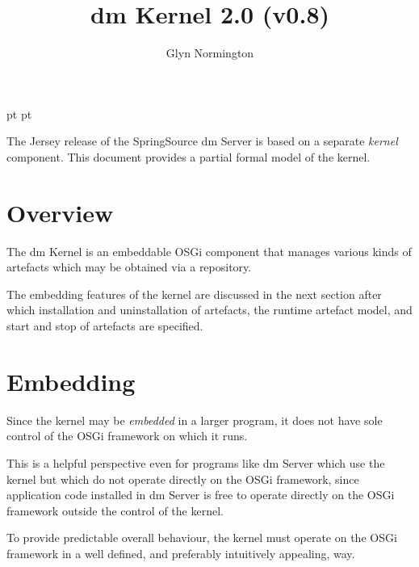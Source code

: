 \documentclass[a4paper,12pt]{article}
\begin{document}
 pt
 pt

\title{dm Kernel 2.0 (v0.8)}
\author{Glyn Normington}
\maketitle
\thispagestyle{myheadings}
\setcounter{page}{0}

The Jersey release of the SpringSource dm Server is based on a separate \textit{kernel} component.
This document provides a partial formal model of the kernel.
\clearpage
{}
\tableofcontents

\newcommand{\true}{true}
\newcommand{\false}{false}
\renewcommand{\empty}{\emptyset}

\clearpage
{}
\section{Overview}

The dm Kernel is an embeddable OSGi component that manages various kinds of artefacts which may be obtained via a repository.

The embedding features of the kernel are discussed in the next section after which installation and
uninstallation of artefacts, the runtime artefact model, and start and stop of artefacts are specified.

\clearpage
\section{Embedding}

Since the kernel may be \textit{embedded} in a larger program, it does not have sole
control of the OSGi framework on which it runs.

This is a helpful perspective even for programs like dm Server which 
use the kernel but which do not operate directly on the OSGi framework, since application code installed in dm Server
is free to operate directly on the OSGi framework outside the control of the kernel.

To provide predictable overall behaviour, the kernel must operate on the OSGi
framework in a well defined, and preferably intuitively appealing, way.
\end{document}
